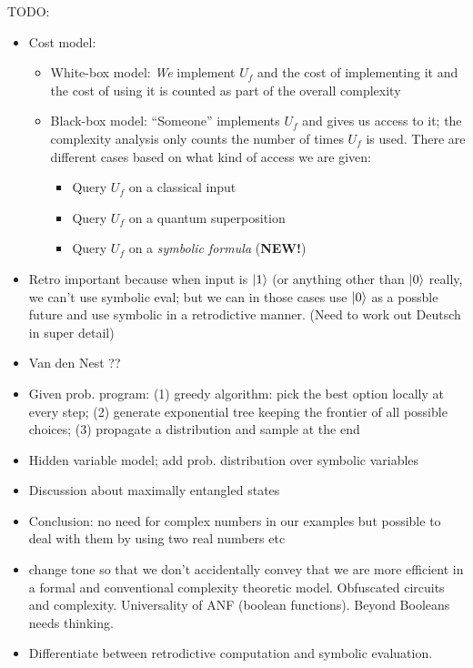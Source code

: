 \documentclass[aps,prl,twocolumn,superscriptaddress,floatfix,notitlepage]{revtex4-2}
\begin{document}
TODO:
\begin{itemize}
\item Cost model:
  \begin{itemize}
  \item White-box model: \emph{We} implement $U_f$ and the cost of
  implementing it and the cost of using it is counted as part of the
  overall complexity
  \item Black-box model: ``Someone'' implements $U_f$ and gives us
  access to it; the complexity analysis only counts the number of
  times $U_f$ is used. There are different cases based on what kind of
  access we are given:
  \begin{itemize}
    \item Query $U_f$ on a classical input 
    \item Query $U_f$ on a quantum superposition
    \item Query $U_f$ on a \emph{symbolic formula} (\textbf{NEW!})
  \end{itemize}
  \end{itemize}
\item Retro important because when input is $\ket{1}$ (or anything
  other than $\ket{0}$ really, we can't use symbolic eval; but we can
 in those cases use $\ket{0}$ as a possble future and use symbolic in
 a retrodictive manner. (Need to work out Deutsch in super detail)
\item Van den Nest ??
  \item Given prob. program: (1) greedy algorithm: pick the best
    option locally at every step; (2) generate exponential tree
    keeping the frontier of all possible choices; (3) propagate a
    distribution and sample at the end
\item Hidden variable model; add prob. distribution over symbolic variables
    \item Discussion about maximally entangled states
    \item Conclusion: no need for complex numbers in our examples but possible to deal with them by using two real numbers etc
    \item change tone so that we don't accidentally convey that we are more efficient in a formal and conventional complexity theoretic model. Obfuscated circuits and complexity. Universality of ANF (boolean functions). Beyond Booleans needs thinking. 
    \item Differentiate between retrodictive computation and symbolic evaluation. 

\end{itemize}
\end{document}
